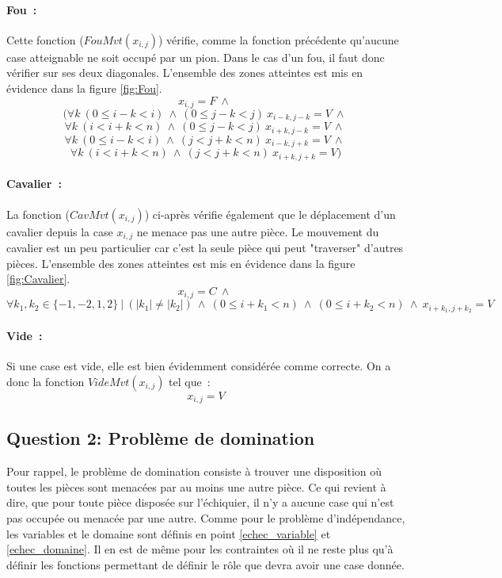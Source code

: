 \documentclass[a4paper,11pt]{article}
\newcommand{\AND}{~\wedge~}
\newcommand{\TQ}{~|~}
\begin{document}
          \paragraph{Fou~:} Cette fonction ($FouMvt(x_{i, j})$) vérifie, comme la fonction précédente qu'aucune case atteignable ne soit occupé par un pion.  Dans le cas d'un fou, il faut donc vérifier sur ses deux diagonales. L'ensemble des zones atteintes est mis en évidence dans la figure \ref{fig:Fou}.
          	\[x_{i, j} = F \AND \]
          	\[(\forall k~(0 \leq i-k < i) \AND (0 \leq j-k < j) ~ x_{i-k, j-k} = V \AND \]
            \[\forall k~(i < i+k < n) \AND (0 \leq j-k < j) ~ x_{i+k, j-k} = V \AND \]
            \[\forall k~(0 \leq i-k < i) \AND (j < j+k < n) ~ x_{i-k, j+k} = V \AND \]
            \[\forall k~(i < i+k < n) \AND (j < j+k < n) ~ x_{i+k, j+k} = V)\]

          \paragraph{Cavalier~:}
          	 La fonction ($CavMvt(x_{i, j})$) ci-après vérifie également que le déplacement d'un cavalier depuis la case $x_{i, j}$ ne menace pas une autre pièce. Le mouvement du cavalier est un peu particulier car c'est la seule pièce qui peut "traverser" d'autres pièces. L'ensemble des zones atteintes est mis en évidence dans la figure \ref{fig:Cavalier}.
             \[x_{i, j} = C \AND \]
             \[\forall k_{1}, k_{2} \in \{-1, -2, 1, 2\} \TQ (|k_{1}| \neq |k_{2}|) \AND (0 \leq i+k_{1} < n) \AND (0 \leq i+k_{2} < n) \AND x_{i+k_{1}, j+k_{2}} = V\]
             
         \paragraph{Vide~:}
         	Si une case est vide, elle est bien évidemment considérée comme correcte.  On a donc la fonction $VideMvt(x_{i, j})$ tel que~:
            \[x_{i,j} = V\]
    
    
    \subsection{Question 2: Problème de domination}
    	Pour rappel, le problème de domination consiste à trouver une disposition où toutes les pièces sont menacées par au moins une autre pièce. Ce qui revient à dire, que pour toute pièce disposée sur l'échiquier, il n'y a aucune case qui n'est pas occupée ou menacée par une autre. Comme pour le problème d'indépendance, les variables et le domaine sont définis en point \ref{echec_variable} et \ref{echec_domaine}. Il en est de même pour les contraintes où il ne reste plus qu'à définir les fonctions permettant de définir le rôle que devra avoir une case donnée.
            
\end{document}
